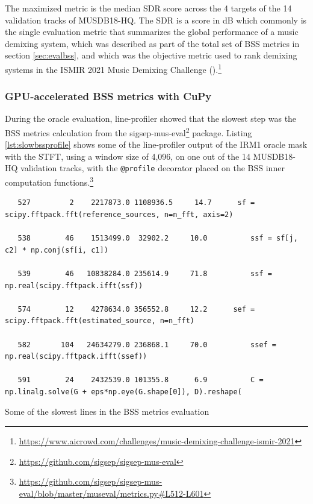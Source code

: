 \documentclass[report.tex]{subfiles}
\begin{document}
The maximized metric is the median SDR score across the 4 targets of the 14 validation tracks of MUSDB18-HQ. The SDR is a score in dB which commonly is the single evaluation metric that summarizes the global performance of a music demixing system, which was described as part of the total set of BSS metrics in section \ref{sec:evalbss}, and which was the objective metric used to rank demixing systems in the ISMIR 2021 Music Demixing Challenge (\cite{mdx21}).\footnote{\url{https://www.aicrowd.com/challenges/music-demixing-challenge-ismir-2021}}

\newpagefill

\subsubsection{GPU-accelerated BSS metrics with CuPy}
\label{sec:fasterbsscupy}

During the oracle evaluation, line-profiler showed that the slowest step was the BSS metrics calculation from the sigsep-mus-eval\footnote{\url{https://github.com/sigsep/sigsep-mus-eval}} package. Listing \ref{lst:slowbssprofile} shows some of the line-profiler output of the IRM1 oracle mask with the STFT, using a window size of 4,096, on one out of the 14 MUSDB18-HQ validation tracks, with the \Verb#@profile# decorator placed on the BSS inner computation functions.\footnote{\url{https://github.com/sigsep/sigsep-mus-eval/blob/master/museval/metrics.py\#L512-L601}}

\begin{listing}[h]
  \centering
\begin{verbatim}
   527         2    2217873.0 1108936.5     14.7      sf = scipy.fftpack.fft(reference_sources, n=n_fft, axis=2)

   538        46    1513499.0  32902.2     10.0          ssf = sf[j, c2] * np.conj(sf[i, c1])

   539        46   10838284.0 235614.9     71.8          ssf = np.real(scipy.fftpack.ifft(ssf))

   574        12    4278634.0 356552.8     12.2      sef = scipy.fftpack.fft(estimated_source, n=n_fft)

   582       104   24634279.0 236868.1     70.0          ssef = np.real(scipy.fftpack.ifft(ssef))

   591        24    2432539.0 101355.8      6.9          C = np.linalg.solve(G + eps*np.eye(G.shape[0]), D).reshape(
\end{verbatim}
  \caption{Some of the slowest lines in the BSS metrics evaluation}
  \label{lst:slowbssprofile}
\end{listing}
\end{document}
